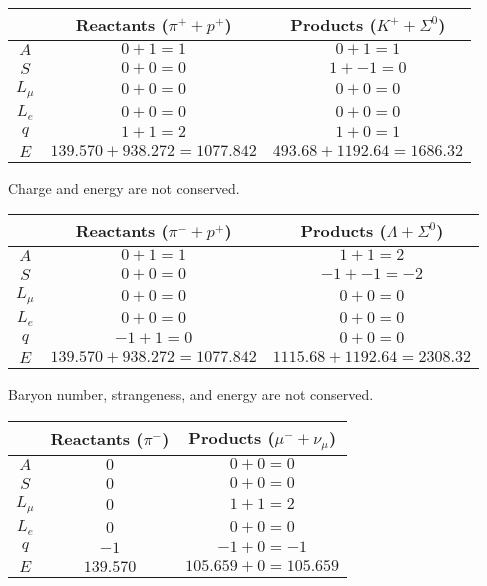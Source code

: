 \documentclass{article}
\begin{document}
\clearpage

\problem
{}
\begin{center}
\begin{tabular}{|c|c|c|}
    \hline
    & Reactants ($\pi^{+} + p^{+}$) & Products ($K^{+} + \Sigma^{0}$) \\
    \hline
    $A$ & $0 + 1 = 1$ & $0 + 1 = 1$ \\
    \hline
    $S$ & $0 + 0 = 0$ & $1 + -1 = 0$ \\
    \hline
    $L_{\mu}$ & $0 + 0 = 0$ & $0 + 0 = 0$ \\
    \hline
    $L_{e}$ & $0 + 0 = 0$ & $0 + 0 = 0$ \\
    \hline
    $q$ & $1 + 1 = 2$ & $1 + 0 = 1$ \\
    \hline
    $E$ & $139.570 + 938.272 = 1077.842$ & $493.68 + 1192.64 = 1686.32$\\
    \hline
\end{tabular}
\end{center}
Charge and energy are not conserved.
\begin{center}
\begin{tabular}{|c|c|c|}
    \hline
    & Reactants ($\pi^{-} + p^{+}$) & Products ($\Lambda + \Sigma^{0}$) \\
    \hline
    $A$ & $0 + 1 = 1$ & $1 + 1 = 2$ \\
    \hline
    $S$ & $0 + 0 = 0$ & $-1 + -1 = -2$ \\
    \hline
    $L_{\mu}$ & $0 + 0 = 0$ & $0 + 0 = 0$ \\
    \hline
    $L_{e}$ & $0 + 0 = 0$ & $0 + 0 = 0$ \\
    \hline
    $q$ & $-1 + 1 = 0$ & $0 + 0 = 0$ \\
    \hline
    $E$ & $139.570 + 938.272 = 1077.842$ & $1115.68 + 1192.64 = 2308.32$\\
    \hline
\end{tabular}
\end{center}
Baryon number, strangeness, and energy are not conserved.
\begin{center}
\begin{tabular}{|c|c|c|}
    \hline
    & Reactants ($\pi^{-}$) & Products ($\mu^{-} + \nu_{\mu}$) \\
    \hline
    $A$ & $0$ & $0 + 0 = 0$ \\
    \hline
    $S$ & $0$ & $0 + 0 = 0$ \\
    \hline
    $L_{\mu}$ & $0$ & $1 + 1 = 2$ \\
    \hline
    $L_{e}$ & $0$ & $0 + 0 = 0$ \\
    \hline
    $q$ & $-1$ & $-1 + 0 = -1$ \\
    \hline
    $E$ & $139.570$ & $105.659 + 0 = 105.659$\\
    \hline
\end{tabular}
\end{center}
\end{document}

